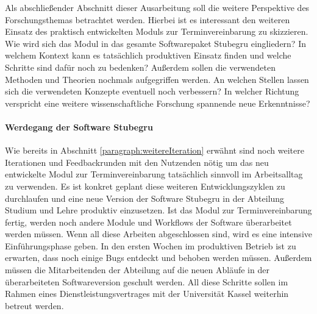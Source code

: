 Als abschließender Abschnitt dieser Ausarbeitung soll die weitere Perspektive
des Forschungsthemas betrachtet werden. Hierbei ist es interessant den weiteren
Einsatz des praktisch entwickelten Moduls zur Terminvereinbarung zu skizzieren.
Wie wird sich das Modul in das gesamte Softwarepaket Stubegru eingliedern? In
welchem Kontext kann es tatsächlich produktiven Einsatz finden und welche
Schritte sind dafür noch zu bedenken? Außerdem sollen die verwendeten Methoden
und Theorien nochmals aufgegriffen werden. An welchen Stellen lassen sich die
verwendeten Konzepte eventuell noch verbessern? In welcher Richtung verspricht
eine weitere wissenschaftliche Forschung spannende neue Erkenntnisse?

\paragraph{Werdegang der Software Stubegru}
Wie bereits in Abschnitt \ref{paragraph:weitereIteration} erwähnt sind noch
weitere Iterationen und Feedbackrunden mit den Nutzenden nötig um das neu
entwickelte Modul zur Terminvereinbarung tatsächlich sinnvoll im Arbeitsalltag
zu verwenden. Es ist konkret geplant diese weiteren Entwicklungszyklen zu
durchlaufen und eine neue Version der Software Stubegru in der Abteilung
Studium und Lehre produktiv einzusetzen. Ist das Modul zur Terminvereinbarung
fertig, werden noch andere Module und Workflows der Software überarbeitet
werden müssen. Wenn all diese Arbeiten abgeschlossen sind, wird es eine
intensive Einführungsphase geben. In den ersten Wochen im produktiven Betrieb
ist zu erwarten, dass noch einige Bugs entdeckt und behoben werden müssen.
Außerdem müssen die Mitarbeitenden der Abteilung auf die neuen Abläufe in der
überarbeiteten Softwareversion geschult werden. All diese Schritte sollen im
Rahmen eines Dienstleistungsvertrages mit der Universität Kassel weiterhin
betreut werden.


